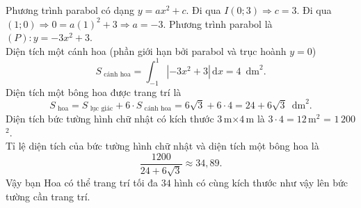 \begin{bt}
{\begin{center}
		\end{center}
		Phương trình parabol  có dạng $y=ax^{2}+c$. Đi qua $I(0;3) \Rightarrow c=3$. Đi qua $(1;0) \Rightarrow 0 = a(1)^{2} + 3 \Rightarrow a=-3$.
		Phương trình parabol là $(P)\colon  y=-3x^{2}+3$.\\
		Diện tích một cánh hoa (phần giới hạn bởi parabol và trục hoành  $y=0$)
		$$S_{\text{ cánh  hoa}} = \displaystyle\int_{-1}^{1}|-3x^{2}+3|\mathrm{\,d}x = 4\,\text{ dm}^2.$$
		Diện tích một bông hoa được trang trí là 
		$$S_{\text{ hoa}} = S_{\text{ lục giác}} + 6 \cdot S_{\text{ cánh hoa}} = 6\sqrt{3} + 6 \cdot 4 = 24  + 6\sqrt{3}\,\text{ dm}^2.$$
		Diện tích bức  tường hình chữ nhật có kích thước $3$\,m$\times 4$\,m là $3 \cdot 4 = 12$\,m$^2$ = $1\,200$ $^2$.\\
		Tỉ lệ diện tích của bức tường hình chữ nhật  và diện tích một bông hoa là
		\[\dfrac{1200}{24 + 6\sqrt{3}} \approx 34{,}89.  \]
		Vậy bạn  Hoa có thể trang trí tối đa $34$ hình có cùng kích thước như vậy lên bức tường cần trang
		 trí.
	} 
\end{bt}

